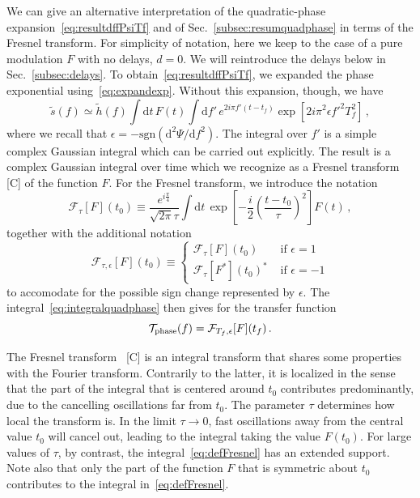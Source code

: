 \documentclass[aps,showpacs,twocolumn,
prd,superscriptaddress,nofootinbib]{revtex4-1}
\newcommand{\be}{\begin{equation}}
\newcommand{\ee}{\end{equation}}
\newcommand\ud{{\mathrm{d}}}
\newcommand\calF{{\mathcal{F}}}
\newcommand\calT{{\mathcal{T}}}
\newcommand{\tf}{t_{f}}
\newcommand{\Tf}{T_{f}}
\newcommand{\SM}[1]{{\color{Red} #1}}
\newcommand{\jgb}[1]{{\color{DarkGreen} #1}}
\begin{document}
We can give an alternative interpretation of the \jgb{quadratic-phase} expansion~\eqref{eq:resultdffPsiTf} and of Sec.~\ref{subsec:resumquadphase} in terms of the Fresnel transform. For simplicity of notation, here we keep to the case of a pure modulation $F$ with no delays, $d=0$. We will reintroduce the delays below in Sec.~\ref{subsec:delays}. To obtain~\eqref{eq:resultdffPsiTf}, we expanded the phase exponential using~\eqref{eq:expandexp}. \jgb{Without this expansion, though}, we have
\be\label{eq:integralquadphase}
	\tilde{s}(f)	\simeq \tilde{h}(f) \int \ud t\, F(t) \int\ud f'\, e^{2i\pi f' (t-\tf)} \exp\left[ 2i\pi^{2} \epsilon{f'}^{2} \Tf^{2} \right] \,,
\ee
where we recall that $\epsilon = -\mathrm{sgn}(\ud ^{2} \Psi/\ud f^{2})$. The integral over $f'$ is a simple complex Gaussian integral \jgb{which can be carried out explicitly. The result is a complex Gaussian integral over time which we recognize as a Fresnel transform~\cite{} \SM{[C]} of the function $F$. For the Fresnel transform, we introduce the notation}
\be\label{eq:defFresnel}
	\calF_{\tau}[F](t_{0}) \equiv \frac{e^{i\frac{\pi}{4}}}{\sqrt{2\pi} \tau} \int \ud t \, \exp\left[ - \frac{i}{2} \left( \frac{t-t_{0}}{\tau} \right)^{2}\right] F(t) \,,
\ee
together with the additional notation
\be\label{eq:Fresnelsign}
	\calF_{\tau, \epsilon}[F](t_{0}) \equiv
\begin{cases}
	 \calF_{\tau}[F](t_{0}) &\text{ if } \epsilon=1 \\
	 \calF_{\tau}[F^{*}](t_{0})^{*} &\text{ if } \epsilon=-1
\end{cases}
\ee
to accomodate for the possible sign change represented by $\epsilon$. The integral~\eqref{eq:integralquadphase} then gives for the transfer function
\be\label{eq:resultFresnel}
	\calT_{\rm phase}(f) = \calF_{\Tf, \epsilon}[F](\tf) \,.
\ee

The Fresnel transform~\cite{} \SM{[C]} is an integral transform that shares some properties with the Fourier transform. Contrarily to the latter, it is localized in the sense that the part of the integral that is centered around $t_{0}$ contributes predominantly, due to the cancelling oscillations far from $t_{0}$.  The parameter $\tau$ determines how local the transform is. In the limit $\tau\rightarrow 0$, fast oscillations away from the central value $t_{0}$ will cancel out, leading to the integral taking the value $F(t_{0})$. For large values of $\tau$, by contrast, the integral~\eqref{eq:defFresnel} has an extended support. Note also that only the part of the function $F$ that is symmetric about $t_{0}$ contributes to the integral in~\eqref{eq:defFresnel}.
\end{document}
